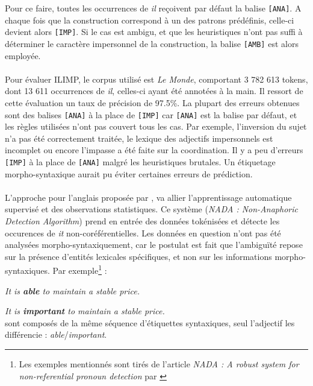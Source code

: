 \documentclass[a4paper,12pt]{article}
\begin{document}
Pour ce faire, toutes les occurrences de \og \textit{il} \fg{} reçoivent par défaut la balise \verb![ANA]!. A chaque fois que la construction correspond à un des patrons prédéfinis, celle-ci devient alors \verb![IMP]!. Si le cas est ambigu, et que les heuristiques n'ont pas suffi à déterminer le caractère impersonnel de la construction, la balise \verb![AMB]! est alors employée.

\paragraph*{}
Pour évaluer ILIMP, le corpus utilisé est \emph{Le Monde}, comportant 3 782 613 tokens, dont 13 611 occurrences de \og{}\textit{il}\fg{}, celles-ci ayant été annotées à la main. Il ressort de cette évaluation un taux de précision de 97.5\%. La plupart des erreurs obtenues sont des balises \verb![ANA]! à la place de \verb![IMP]! car \verb![ANA]! est la balise par défaut, et les règles utilisées n'ont pas couvert tous les cas. Par exemple, l'inversion du sujet n'a pas été correctement traitée, le lexique des adjectifs impersonnels est incomplet ou encore l'impasse a été faite sur la coordination.
Il y a peu d'erreurs \verb![IMP]! à la place de \verb![ANA]! malgré les heuristiques brutales.
Un étiquetage morpho-syntaxique aurait pu éviter certaines erreurs de prédiction.

\paragraph{}
L'approche pour l'anglais proposée par \citet{Bergsma-11}, va allier l'apprentissage automatique supervisé et des observations statistiques.
Ce système (\textit{NADA : Non-Anaphoric Detection Algorithm}) prend en entrée des données tokénisées et détecte les occurences de \og{}\textit{it}\fg{} non-coréférentielles. Les données en question n'ont pas été analysées morpho-syntaxiquement, car le postulat est fait que l'ambiguïté repose sur la présence d'entités lexicales spécifiques, et non sur les informations morpho-syntaxiques.
Par exemple\footnote{Les exemples mentionnés sont tirés de l'article \textit{NADA : A robust system for non-referential pronoun detection} par \citet{Bergsma-11}} :

\og{} \textit{It is \textbf{able} to maintain a stable price.} \fg{}

\og{} \textit{It is \textbf{important} to maintain a stable price.} \fg{}
\\
sont composés de la même séquence d'étiquettes syntaxiques, seul l'adjectif les différencie : \textit{able}/\textit{important}.
\end{document}
